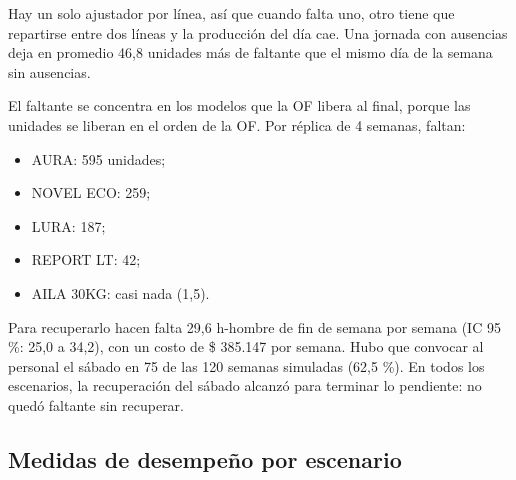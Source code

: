 \documentclass[11pt,a4paper]{article}
\begin{document}
Hay un solo ajustador por línea, así que cuando falta uno, otro tiene que repartirse entre dos líneas y la producción del día cae. Una jornada con ausencias deja en promedio 46,8 unidades más de faltante que el mismo día de la semana sin ausencias.

El faltante se concentra en los modelos que la OF libera al final, porque las unidades se liberan en el orden de la OF. Por réplica de 4 semanas, faltan:

\begin{itemize}
\item AURA: 595 unidades;
\item NOVEL ECO: 259;
\item LURA: 187;
\item REPORT LT: 42;
\item AILA 30KG: casi nada (1,5).
\end{itemize}

Para recuperarlo hacen falta 29,6 h-hombre de fin de semana por semana (IC 95 \%: 25,0 a 34,2), con un costo de \$ 385.147 por semana. Hubo que convocar al personal el sábado en 75 de las 120 semanas simuladas (62,5 \%). En todos los escenarios, la recuperación del sábado alcanzó para terminar lo pendiente: no quedó faltante sin recuperar.

\subsection{Medidas de desempeño por escenario}
\end{document}
